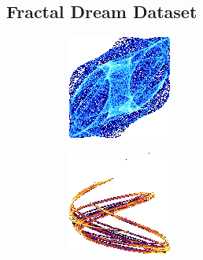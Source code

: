 \documentclass[11pt,francais]{article}
\begin{document}
\subsection{Fractal Dream Dataset}
\label{sec:FDD}
\begin{figure}[!h]
    \centering
    \begin{subfigure}[b]{0.20\textwidth}
        \includegraphics[width=\textwidth]{Figures/FDD/-0,00545687187361743_-0,5312304575586382_1,8197494653032407_2,422111729355857_1,4944898296889655_2,487490210145214.png}
    \end{subfigure}
    \begin{subfigure}[b]{0.20\textwidth}
        \includegraphics[width=\textwidth]{Figures/FDD/-0,319459804135373_-0,0981842500805612_0,42291442353441633_1,7253282321258185_1,4272325555244099_1,3701336149016234.png}

\end{subfigure}
\end{figure}
\end{document}
